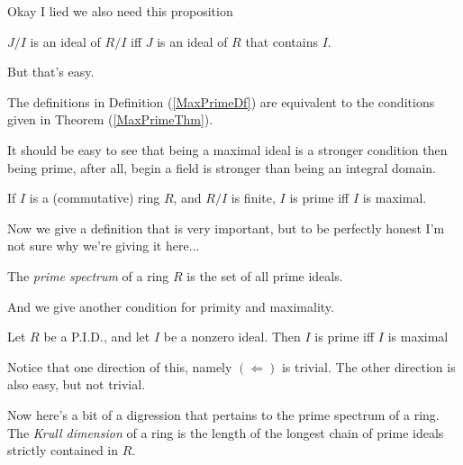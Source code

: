 \documentclass[12pt, twosided]{article}
\begin{document}
Okay I lied we also need this proposition

\begin{prop}
  \(J/I\) is an ideal of \(R/I\) iff \(J\) is an ideal of \(R\) that contains \(I\).
\end{prop}

But that's easy.

\begin{exr}
  The definitions in Definition (\ref{MaxPrimeDf}) are equivalent to the conditions given in Theorem (\ref{MaxPrimeThm}).
\end{exr}

It should be easy to see that being a maximal ideal is a stronger condition then being prime, after all, begin a field is stronger than being an integral domain.

\begin{cor}
  If \(I\) is a (commutative) ring \(R\), and \(R/I\) is finite, \(I\) is prime iff \(I\) is maximal.
\end{cor}

Now we give a definition that is very important, but to be perfectly honest I'm not sure why we're giving it here...
\begin{df}
  The \textit{prime spectrum} of a ring \(R\) is the set of all prime ideals.
\end{df}

And we give another condition for primity and maximality.

\begin{prop}
  Let \(R\) be a P.I.D., and let \(I\) be a nonzero ideal. Then \(I\) is prime iff \(I\) is maximal
\end{prop}

Notice that one direction of this, namely \((\Leftarrow)\) is trivial. The other direction is also easy, but not trivial.

Now here's a bit of a digression that pertains to the prime spectrum of a ring. The \textit{Krull dimension}  of a ring is the length of the longest chain of prime ideals strictly contained in \(R\).
\end{document}
